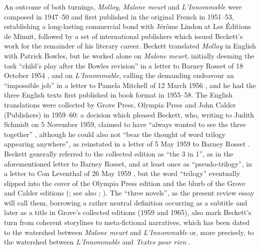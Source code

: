 \begin{paper}
\noindent An outcome of both turnings, \emph{Molloy}, \emph{Malone meurt} and
\emph{L'Innommable} were composed in 1947\emph{--}50 and first published
in the original French in 1951\emph{--}53, establishing a long-lasting
commercial bond with Jérôme Lindon at Les Éditions de Minuit, followed
by a set of international publishers which issued Beckett's work for the
remainder of his literary career. Beckett translated \emph{Molloy} in
English with Patrick Bowles, but he worked alone on \emph{Malone meurt},
initially deeming the task ``child's play after the Bowles revision'' in
a letter to Barney Rosset of 18 October 1954 \citep[2: 507]{beckett_letters_2009},
and on \emph{L'Innommable}, calling the demanding endeavour an
``impossible job'' in a letter to Pamela Mitchell of 12 March 1956 \citep[2: 606]{beckett_letters_2009}, and he had the three English texts first
published in book format in 1955--58. The English translations
were collected by Grove Press, Olympia Press and John Calder
(Publishers) in 1959\emph{--}60: a decision which pleased Beckett, who,
writing to Judith Schmidt on 5 November 1959, claimed to have ``always
wanted to see the three together'' \citep[qtd. in][118]{oreilly_making_2017},
although he could also not ``bear the thought of word trilogy appearing
anywhere'', as reinstated in a letter of 5 May 1959 to Barney Rosset \citep[3: 230]{beckett_letters_2009}. Beckett generally referred to the collected
edition as ``the 3 in 1'', as in the aforementioned letter to Barney
Rosset, and at least once as ``pseudo-trilogy'', in a letter to Con
Leventhal of 26 May 1959 \citep[qtd. in][185]{cohn_beckett_2001}, but the word
``trilogy'' eventually slipped into the cover of the Olympia Press
edition and the blurb of the Grove and Calder editions (\citealt[81--82]{van_hulle_making_2014}; see also \citealt[107]{van_hulle_making_2017}; \citealt[100 and 121]{oreilly_making_2017}). The ``three novels'', as the present
review essay will call them, borrowing a rather neutral definition
occurring as a subtitle and later as a title in Grove's collected
editions (1959 and 1965), also mark Beckett's turn from coherent
storylines to meta-fictional narratives, which has been dated to the
watershed between \emph{Malone meurt} and \emph{L'Innommable} or, more
precisely, to the watershed between \emph{L'Innommable} and \emph{Textes
pour rien} \citep[23]{van_hulle_making_2017}.


\end{paper}
